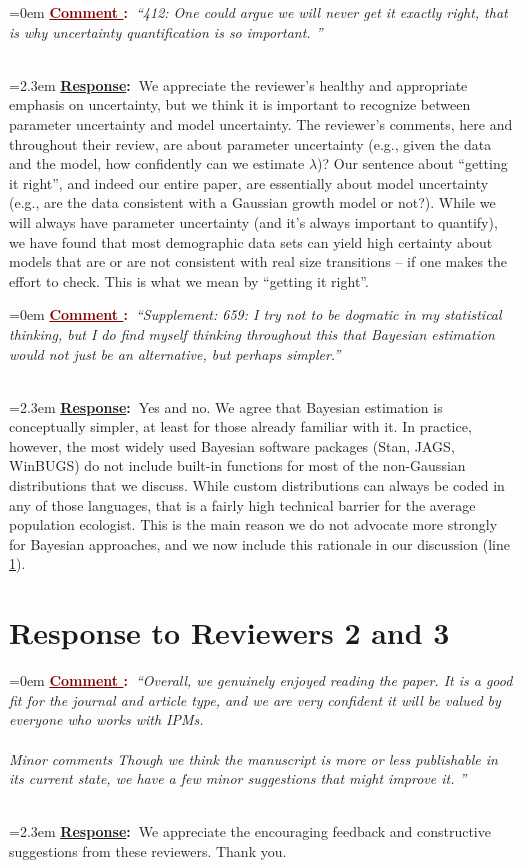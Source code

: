 \documentclass[12pt]{article}
\newcounter{cN}
\newcommand{\comment}[1]{
	\vspace{2em}
	\refstepcounter{cN} %
	\noindent \hangindent=0em \textbf{\textcolor{Maroon}{\uline{Comment \thecN}:~}}\emph{``#1''}
	}
\newcommand{\response}[1]{
	\\[0.25em]
	\hangindent=2.3em \textbf{\textcolor{NavyBlue}{\uline{Response}:~}}#1
	}
\begin{document}
\comment{412: One could argue we will never get it exactly right, that is why uncertainty quantification is so important. }
\response{We appreciate the reviewer's healthy and appropriate emphasis on uncertainty, but we think it is important to recognize between parameter uncertainty and model uncertainty. The reviewer's comments, here and throughout their review, are about parameter uncertainty (e.g., given the data and the model, how confidently can we estimate $\lambda$)? Our sentence about ``getting it right'', and indeed our entire paper, are essentially about model uncertainty (e.g., are the data consistent with a Gaussian growth model or not?). While we will always have parameter uncertainty (and it's always important to quantify), we have found that most demographic data sets can yield high certainty about models that are or are not consistent with real size transitions -- if one makes the effort to check. This is what we mean by ``getting it right''.}

\comment{Supplement: 659: I try not to be dogmatic in my statistical thinking, but I do find myself thinking throughout this that Bayesian estimation would not just be an alternative, but perhaps simpler.}
\response{Yes and no. We agree that Bayesian estimation is conceptually simpler, at least for those already familiar with it. In practice, however, the most widely used Bayesian software packages (Stan, JAGS, WinBUGS) do not include built-in functions for most of the non-Gaussian distributions that we discuss. While custom distributions can always be coded in any of those languages, that is a fairly high technical barrier for the average population ecologist. This is the main reason we do not advocate more strongly for Bayesian approaches, and we now include this rationale in our discussion (line \ref{}).}

\section{Response to Reviewers 2 and 3}
\vspace{-2em}

\comment{Overall, we genuinely enjoyed reading the paper. It is a good fit for the journal and article type, and we are very confident it will be valued by everyone who works with IPMs.
\\
\\
Minor comments
Though we think the manuscript is more or less publishable in its current state, we have a few minor suggestions that might improve it.
}
\response{We appreciate the encouraging feedback and constructive suggestions from these reviewers. Thank you.}
\end{document}
